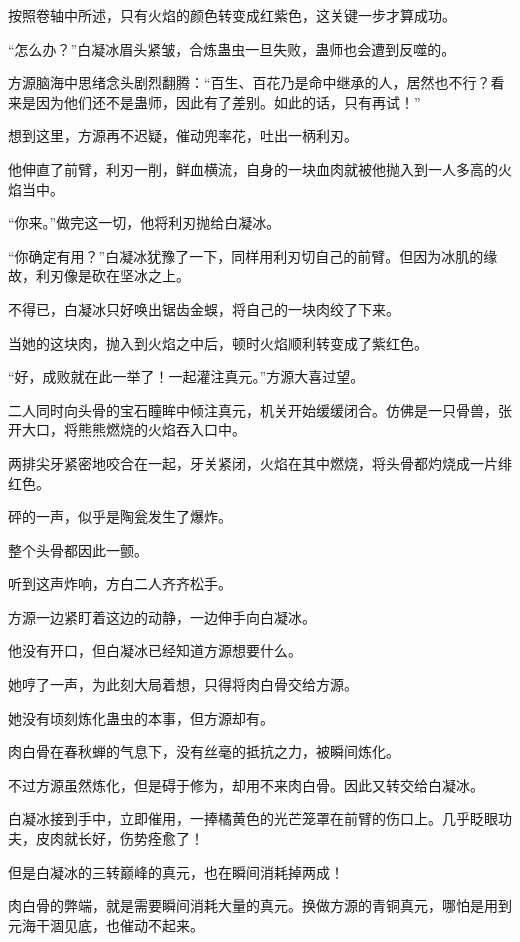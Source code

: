 \begin{this_body}
按照卷轴中所述，只有火焰的颜色转变成红紫色，这关键一步才算成功。

“怎么办？”白凝冰眉头紧皱，合炼蛊虫一旦失败，蛊师也会遭到反噬的。

方源脑海中思绪念头剧烈翻腾：“百生、百花乃是命中继承的人，居然也不行？看来是因为他们还不是蛊师，因此有了差别。如此的话，只有再试！”

想到这里，方源再不迟疑，催动兜率花，吐出一柄利刃。

他伸直了前臂，利刃一削，鲜血横流，自身的一块血肉就被他抛入到一人多高的火焰当中。

“你来。”做完这一切，他将利刃抛给白凝冰。

“你确定有用？”白凝冰犹豫了一下，同样用利刃切自己的前臂。但因为冰肌的缘故，利刃像是砍在坚冰之上。

不得已，白凝冰只好唤出锯齿金蜈，将自己的一块肉绞了下来。

当她的这块肉，抛入到火焰之中后，顿时火焰顺利转变成了紫红色。

“好，成败就在此一举了！一起灌注真元。”方源大喜过望。

二人同时向头骨的宝石瞳眸中倾注真元，机关开始缓缓闭合。仿佛是一只骨兽，张开大口，将熊熊燃烧的火焰吞入口中。

两排尖牙紧密地咬合在一起，牙关紧闭，火焰在其中燃烧，将头骨都灼烧成一片绯红色。

砰的一声，似乎是陶瓮发生了爆炸。

整个头骨都因此一颤。

听到这声炸响，方白二人齐齐松手。

方源一边紧盯着这边的动静，一边伸手向白凝冰。

他没有开口，但白凝冰已经知道方源想要什么。

她哼了一声，为此刻大局着想，只得将肉白骨交给方源。

她没有顷刻炼化蛊虫的本事，但方源却有。

肉白骨在春秋蝉的气息下，没有丝毫的抵抗之力，被瞬间炼化。

不过方源虽然炼化，但是碍于修为，却用不来肉白骨。因此又转交给白凝冰。

白凝冰接到手中，立即催用，一捧橘黄色的光芒笼罩在前臂的伤口上。几乎眨眼功夫，皮肉就长好，伤势痊愈了！

但是白凝冰的三转巅峰的真元，也在瞬间消耗掉两成！

肉白骨的弊端，就是需要瞬间消耗大量的真元。换做方源的青铜真元，哪怕是用到元海干涸见底，也催动不起来。


\end{this_body}
